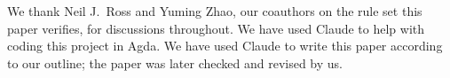 \documentclass[acmsmall,review,anonymous]{acmart}
\begin{document}





\begin{acks}
We thank Neil J.\ Ross and Yuming Zhao, our coauthors on the rule set
this paper verifies, for discussions throughout.  We have used Claude to
help with coding this project in Agda.  We have used Claude to write this
paper according to our outline; the paper was later checked and revised
by us.
\end{acks}



\end{document}
